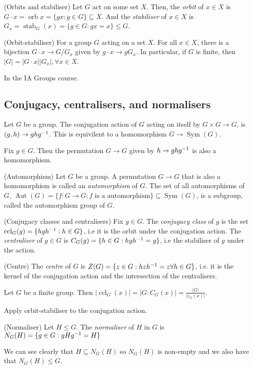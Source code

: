 \documentclass{article}
\DeclareMathOperator{\sym}{Sym}
\DeclareMathOperator{\orb}{orb}
\DeclareMathOperator{\stab}{stab}
\DeclareMathOperator{\aut}{Aut}
\DeclareMathOperator{\ccl}{ccl}
\begin{document}
\begin{definition}
	(Orbits and stabiliser) Let $ G $ act on some set $ X $. Then, the \textit{orbit} of $ x\in X $ is $ G\cdot x=\orb x=\{gx : g\in G\}\subseteq X $. And the \textit{stabiliser} of $ x\in X $ is $ G_x=\stab_G(x) = \{g\in G:gx=x\}\le G $.
\end{definition}
\begin{theorem}
	(Orbit-stabiliser) For a group $ G $ acting on a set $ X $. For all $ x\in X $, there is a bijection $ G\cdot x \to G/G_x $ given by $ g\cdot x \to gG_x $. In particular, if $ G $ is finite, then $ |G|=|G\cdot x||G_x|, \forall x\in X $.
\end{theorem}
\pf In the IA Groups course.
\subsection{Conjugacy, centralisers, and normalisers}
Let $ G $ be a group. The conjugation action of $ G $ acting on itself by $ G\times G\to G $, is $ (g,h)\to gh{g}^{-1} $. This is equivilent to a homomorphism $ G\to\sym(G) $.

\par
Fix $ g\in G $. Then the permutation $ G\to G $ given by $ h\to gh{g}^{-1} $ is also a homomorphism.

\begin{definition}
	(Automorphism) Let $ G $ be a group. A permutation $ G\to G $ that is also a homomorphism is called an \textit{automorphism} of $ G $. The set of all automorphisms of $ G $, $ \aut(G) =\{f:G\to G: f \text{ is a automorphism}\}\subseteq \sym(G) $, is a subgroup, called the automorphism group of $ G $.
\end{definition}

\begin{definition}
	(Conjugacy classes and centralisers) Fix $ g\in G $. The \textit{conjugacy class} of $ g $ is the set $ \ccl_G(g) = \{hg\inv h: h\in G\} $, i.e it is the orbit under the conjugation action. The \textit{centraliser} of $ g\in G $ is $ C_G(g)=\{h\in G:hg{h}^{-1}=g\} $, i.e the stabiliser of $ g $ under the action.
\end{definition}
\begin{definition}
	(Centre) The \textit{centre} of $ G $ is $ Z(G)=\{z\in G:hz{h}^{-1}=z\forall h\in G\} $, i.e. it is the kernel of the conjugation action and the intersection of the centralisers.
\end{definition}
\begin{corollary}
	Let $ G $ be a finite group. Then $ |\ccl_G(x)|=|G:C_G(x)|=\frac{|G|}{|c_G(x)|} $.
\end{corollary}	
\pf Apply orbit-stabiliser to the conjugation action.
\begin{definition}
	(Normaliser) Let $ H\le G $. The \textit{normaliser} of $ H $ in $ G $ is $ N_G(H)=\{g\in G: gH{g}^{-1} = H\} $
\end{definition}
We can see clearly that $ H\subseteq N_G(H) $ so $ N_G(H) $ is non-empty and we also have that $ N_G(H)\le G $.
\end{document}
